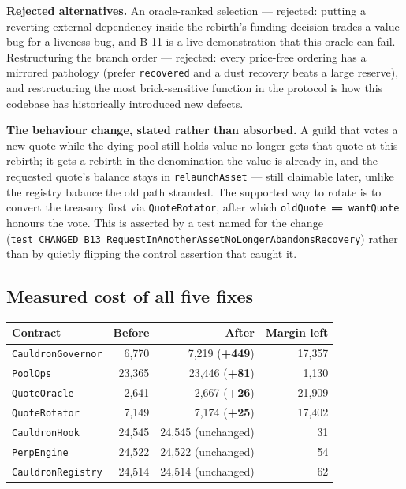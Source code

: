 \documentclass[11pt,a4paper]{article}
\newcommand{\code}[1]{\texttt{\small #1}}
\begin{document}
\textbf{Rejected alternatives.} An oracle-ranked selection --- rejected: putting a
reverting external dependency inside the rebirth's funding decision trades a value bug for
a liveness bug, and B-11 is a live demonstration that this oracle can fail. Restructuring
the branch order --- rejected: every price-free ordering has a mirrored pathology (prefer
\code{recovered} and a dust recovery beats a large reserve), and restructuring the most
brick-sensitive function in the protocol is how this codebase has historically introduced
new defects.

\textbf{The behaviour change, stated rather than absorbed.} A guild that votes a new quote
while the dying pool still holds value no longer gets that quote at this rebirth; it gets
a rebirth in the denomination the value is already in, and the requested quote's balance
stays in \code{relaunchAsset} --- still claimable later, unlike the registry balance the
old path stranded. The supported way to rotate is to convert the treasury first via
\code{QuoteRotator}, after which \code{oldQuote == wantQuote} honours the vote. This is
asserted by a test named for the change
(\code{test\_CHANGED\_B13\_RequestInAnotherAssetNoLongerAbandonsRecovery}) rather than by
quietly flipping the control assertion that caught it.

\subsection{Measured cost of all five fixes}

\begin{center}
\begin{tabular}{@{}lrrr@{}}
\toprule
\textbf{Contract} & \textbf{Before} & \textbf{After} & \textbf{Margin left} \\
\midrule
\code{CauldronGovernor} & 6{,}770 & 7{,}219 (\textbf{+449}) & 17{,}357 \\
\code{PoolOps} & 23{,}365 & 23{,}446 (\textbf{+81}) & 1{,}130 \\
\code{QuoteOracle} & 2{,}641 & 2{,}667 (\textbf{+26}) & 21{,}909 \\
\code{QuoteRotator} & 7{,}149 & 7{,}174 (\textbf{+25}) & 17{,}402 \\
\midrule
\code{CauldronHook} & 24{,}545 & 24{,}545 (unchanged) & 31 \\
\code{PerpEngine} & 24{,}522 & 24{,}522 (unchanged) & 54 \\
\code{CauldronRegistry} & 24{,}514 & 24{,}514 (unchanged) & 62 \\
\bottomrule
\end{tabular}
\end{center}
\end{document}
